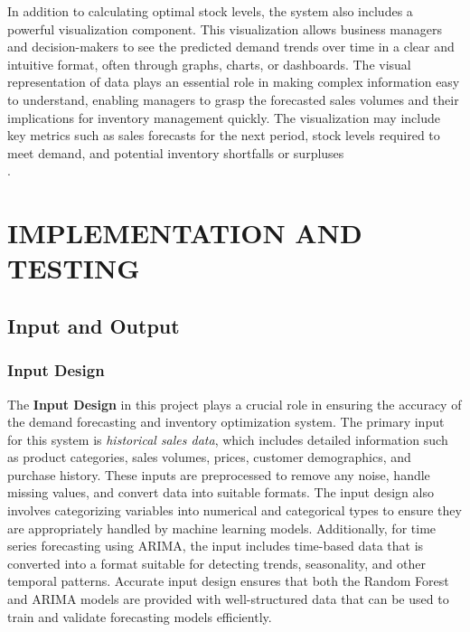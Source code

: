 \documentclass[10pt]{report}
\begin{document}
\begin{center}
In addition to calculating optimal stock levels, the system also includes a powerful visualization component. This visualization allows business managers and decision-makers to see the predicted demand trends over time in a clear and intuitive format, often through graphs, charts, or dashboards. The visual representation of data plays an essential role in making complex information easy to understand, enabling managers to grasp the forecasted sales volumes and their implications for inventory management quickly. The visualization may include key metrics such as sales forecasts for the next period, stock levels required to meet demand, and potential inventory shortfalls or surpluses\\.

\chapter{IMPLEMENTATION AND TESTING}
\linespread{1.5}
\section{Input and Output}

\subsection{Input Design}
The \textbf{Input Design} in this project plays a crucial role in ensuring the accuracy of the demand forecasting and inventory optimization system. The primary input for this system is \textit{historical sales data}, which includes detailed information such as product categories, sales volumes, prices, customer demographics, and purchase history. These inputs are preprocessed to remove any noise, handle missing values, and convert data into suitable formats. The input design also involves categorizing variables into numerical and categorical types to ensure they are appropriately handled by machine learning models. Additionally, for time series forecasting using ARIMA, the input includes time-based data that is converted into a format suitable for detecting trends, seasonality, and other temporal patterns. Accurate input design ensures that both the Random Forest and ARIMA models are provided with well-structured data that can be used to train and validate forecasting models efficiently.


\end{center}
\end{document}
